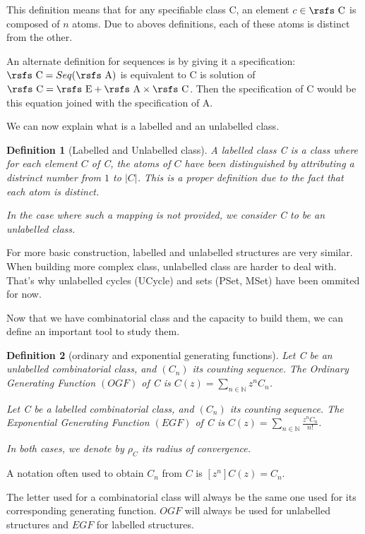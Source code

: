 \documentclass{article}
\newtheorem{definition}{Definition}
\begin{document}
This definition means that for any specifiable class {\rsfs C}, an element $c \in \text{\rsfs C}$ is composed of $n$ atoms. Due to aboves definitions, each of these atoms is distinct from the other. 

An alternate definition for sequences is by giving it a specification: $\text{\rsfs C} = Seq(\text{\rsfs A})$ is equivalent to {\rsfs C} is solution of $\text{\rsfs C} = \text{\rsfs E} + \text{\rsfs A} \times \text{\rsfs C}$. Then the specification of {\rsfs C} would be this equation joined with the specification of {\rsfs A}.

We can now explain what is a labelled and an unlabelled class.
\begin{definition}[Labelled and Unlabelled class]
A labelled class {\rsfs C} is a class where for each element $C$ of {\rsfs C}, the atoms of $C$ have been distinguished by attributing a distrinct number from $1$ to $|C|$. This is a proper definition due to the fact that each atom is distinct.

In the case where such a mapping is not provided, we consider {\rsfs C} to be an unlabelled class.
\end{definition}

For more basic construction, labelled and unlabelled structures are very similar. When building more complex class, unlabelled class are harder to deal with. That's why unlabelled cycles (UCycle) and sets (PSet, MSet) have been ommited for now.

Now that we have combinatorial class and the capacity to build them, we can define an important tool to study them.
\begin{definition}[ordinary and exponential generating functions]
Let {\rsfs C} be an unlabelled combinatorial class, and $(C_n)$ its counting sequence. The Ordinary Generating Function $(OGF)$ of {\rsfs C} is $C(z) = \displaystyle\sum_{n\in \mathbb{N}} z^nC_n$.

Let {\rsfs C} be a labelled combinatorial class, and $(C_n)$ its counting sequence. The Exponential Generating Function $(EGF)$ of {\rsfs C} is $C(z) = \displaystyle\sum_{n\in \mathbb{N}} \frac{z^nC_n}{n!}$.

In both cases, we denote by $\rho_C$ its radius of convergence.
\end{definition}
A notation often used to obtain $C_n$ from $C$ is $[z^n]C(z) = C_n$.

The letter used for a combinatorial class will always be the same one used for its corresponding generating function. $OGF$ will always be used for unlabelled structures and $EGF$ for labelled structures.
\end{document}
